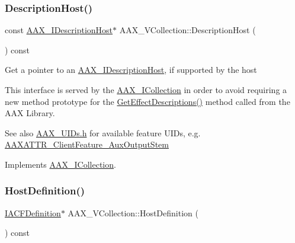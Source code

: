 \subsubsection{\texorpdfstring{DescriptionHost()}{DescriptionHost()}\hspace{0.1cm}{\footnotesize\ttfamily [2/2]}}
{\footnotesize\ttfamily const \mbox{\hyperlink{a01793}{A\+A\+X\+\_\+\+I\+Description\+Host}}$\ast$ A\+A\+X\+\_\+\+V\+Collection\+::\+Description\+Host (\begin{DoxyParamCaption}{ }\end{DoxyParamCaption}) const\hspace{0.3cm}{\ttfamily [virtual]}}





Get a pointer to an \mbox{\hyperlink{a01793}{A\+A\+X\+\_\+\+I\+Description\+Host}}, if supported by the host

This interface is served by the \mbox{\hyperlink{a01777}{A\+A\+X\+\_\+\+I\+Collection}} in order to avoid requiring a new method prototype for the \mbox{\hyperlink{a00796_gae0d356eef326f77cbb972e48946d4892}{Get\+Effect\+Descriptions()}} method called from the A\+AX Library.

\begin{DoxySeeAlso}{See also}
\mbox{\hyperlink{a00683}{A\+A\+X\+\_\+\+U\+I\+Ds.\+h}} for available feature U\+I\+Ds, e.\+g. \mbox{\hyperlink{a00683_aa6369eb43ac68152d30ec665de5ea603}{A\+A\+X\+A\+T\+T\+R\+\_\+\+Client\+Feature\+\_\+\+Aux\+Output\+Stem}} 
\end{DoxySeeAlso}


Implements \mbox{\hyperlink{a01777_a47ed935bdc38c43efa64ec36cee03a7c}{A\+A\+X\+\_\+\+I\+Collection}}.

\mbox{\label{a01897_a9ca97f39ce8e458da67a4c1f4a7a7a4b}} 
\subsubsection{\texorpdfstring{HostDefinition()}{HostDefinition()}}
{\footnotesize\ttfamily \mbox{\hyperlink{a01413}{I\+A\+C\+F\+Definition}}$\ast$ A\+A\+X\+\_\+\+V\+Collection\+::\+Host\+Definition (\begin{DoxyParamCaption}{ }\end{DoxyParamCaption}) const\hspace{0.3cm}{\ttfamily [virtual]}}





